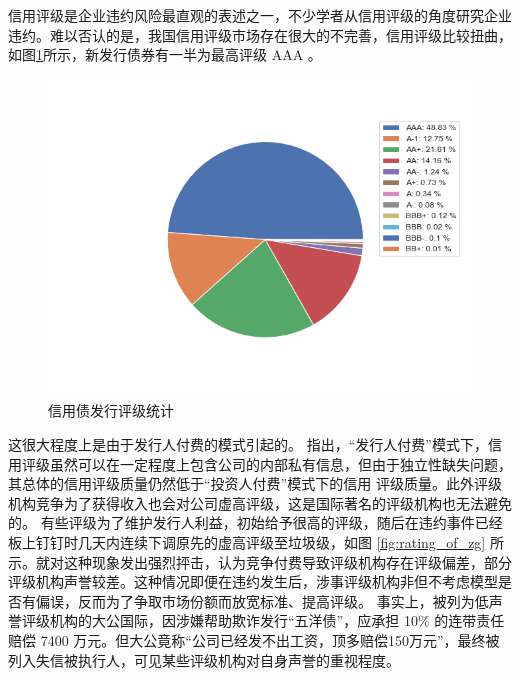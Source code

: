 信用评级是企业违约风险最直观的表述之一，不少学者从信用评级的角度研究企业违约。难以否认的是，我国信用评级市场存在很大的不完善，信用评级比较扭曲，如图\ref{fig:rating}所示，新发行债券有一半为最高评级 AAA 。
\begin{figure}[h]
	\centering
	\includegraphics[width=0.9\linewidth]{./data/rating_from_2014.png}
	\caption{\label{fig:rating}信用债发行评级统计}
\end{figure}
这很大程度上是由于发行人付费的模式引起的。\Textcite{吴育辉2020} 指出，“发行人付费”模式下，信用评级虽然可以在一定程度上包含公司的内部私有信息，但由于独立性缺失问题，其总体的信用评级质量仍然低于“投资人付费”模式下的信用 评级质量。此外评级机构竞争为了获得收入也会对公司虚高评级，这是国际著名的评级机构也无法避免的\Parencite{opp2013rating}。
有些评级为了维护发行人利益，初始给予很高的评级，随后在违约事件已经板上钉钉时几天内连续下调原先的虚高评级至垃圾级，如图 \ref{fig:rating_of_zg}  所示。\Textcite{陈关亭2021多重信用评级与债券融资成本}就对这种现象发出强烈抨击，认为竞争付费导致评级机构存在评级偏差，部分评级机构声誉较差。这种情况即便在违约发生后，涉事评级机构非但不考虑模型是否有偏误，反而为了争取市场份额而放宽标准、提高评级\cite{黄小琳2017债券违约对涉事信用评级机构的影响}。
事实上，被\Textcite{王雄元2013声誉机制}列为低声誉评级机构的大公国际，因涉嫌帮助欺诈发行“五洋债”，应承担 10\% 的连带责任赔偿 7400 万元。但大公竟称“公司已经发不出工资，顶多赔偿150万元”，最终被列入失信被执行人，可见某些评级机构对自身声誉的重视程度。
